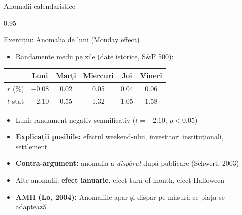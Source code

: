 \documentclass[9pt, aspectratio=169, t]{beamer}
\begin{document}
\begin{frame}{Anomalii calendaristice}
    \begin{cminipage}{0.95\textwidth}
\begin{block}{Exercițiu: Anomalia de luni (Monday effect)}
\begin{itemize}\setlength{\itemsep}{0pt}
    \item Randamente medii pe zile (date istorice, S\&P 500):
\end{itemize}
\renewcommand{\arraystretch}{1.2}
\begin{center}
\begin{tabular}{lccccc}
\toprule
 & Luni & Marți & Miercuri & Joi & Vineri \\
\midrule
$\bar{r}$ (\%) & $-0.08$ & 0.02 & 0.05 & 0.04 & 0.06 \\
$t$-stat & $-2.10$ & 0.55 & 1.32 & 1.05 & 1.58 \\
\bottomrule
\end{tabular}
\end{center}
\end{block}

\vspace{0.2cm}
\begin{itemize}\setlength{\itemsep}{0pt}
    \item Luni: randament negativ semnificativ ($t = -2.10$, $p < 0.05$)
    \item \textbf{Explicații posibile:} efectul weekend-ului, investitori instituționali, settlement
    \item \textbf{Contra-argument:} anomalia a \textit{dispărut} după publicare (Schwert, 2003)
    \item Alte anomalii: \textbf{efect ianuarie}, efect turn-of-month, efect Halloween
    \item \textbf{AMH (Lo, 2004):} Anomaliile apar și dispar pe măsură ce piața se adaptează
\end{itemize}
    \end{cminipage}
\end{frame}
\end{document}
